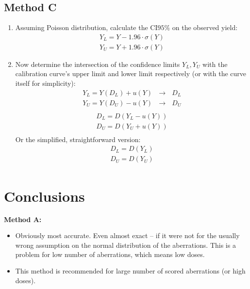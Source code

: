 \documentclass[a4paper,11pt]{article}
\begin{document}
\subsection{Method C}
\begin{enumerate}
\item Assuming Poisson distribution, calculate the CI$95\%$ on the observed yield:
\begin{equation} \label{eq:YCI}
\begin{split}
Y_L = Y - 1.96\cdot \sigma(Y) \\
Y_U = Y + 1.96\cdot \sigma(Y)
\end{split}
\end{equation}
\item Now determine the intersection of the confidence limits $Y_L, Y_U$ with the calibration curve's upper limit and lower limit respectively (or with the curve itself for simplicity):
 \begin{equation} \label{eq:inter1}
\begin{split}
Y_L = Y(D_L) + u(Y)~~~\rightarrow~~~D_L\\
Y_U = Y(D_U) - u(Y)~~~\rightarrow~~~D_U\\
\end{split}
\end{equation}
\begin{equation} \label{eq:inter2}
\begin{split}
D_L = D(Y_L - u(Y)) \\
D_U = D(Y_U + u(Y)) \\
\end{split}
\end{equation}
Or the simplified, straightforward version:
\begin{equation} \label{eq:inter3}
\begin{split}
D_L = D(Y_L) \\
D_U = D(Y_U) \\
\end{split}
\end{equation}
\end{enumerate}

\section{Conclusions}
\textbf{Method A:}
\begin{itemize}
\item Obviously most accurate. Even almost exact -- if it were not for the usually wrong assumption on the normal distribution of the aberrations. This is a problem for low number of aberrations, which means low doses.
\item This method is recommended for large number of scored aberrations (or high doses).
\end{itemize}
\end{document}
